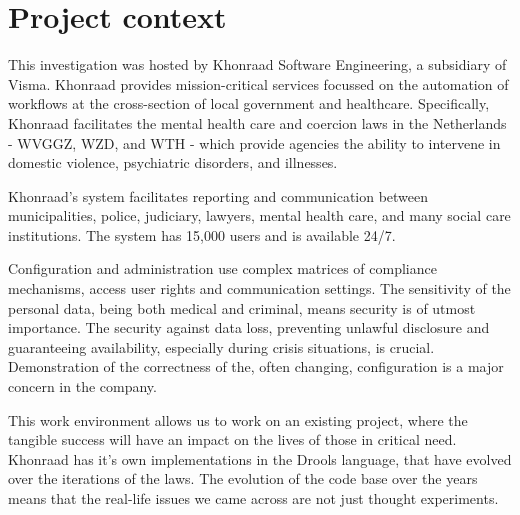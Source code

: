 \section{Project context}

This investigation was hosted by Khonraad Software Engineering, a subsidiary of Visma.
Khonraad provides mission-critical services focussed on the automation of workflows at the cross-section of local government and healthcare.
Specifically, Khonraad facilitates the mental health care and coercion laws in the Netherlands - WVGGZ, WZD, and WTH - which provide agencies the ability to intervene in domestic violence, psychiatric disorders, and illnesses.

Khonraad's system facilitates reporting and communication between municipalities, police, judiciary, lawyers, mental health care, and many social care institutions.
The system has 15,000 users and is available 24/7. 

Configuration and administration use complex matrices of compliance mechanisms, access user rights and communication settings.
The sensitivity of the personal data, being both medical and criminal, means security is of utmost importance.
The security against data loss, preventing unlawful disclosure and guaranteeing availability, especially during crisis situations, is crucial.
Demonstration of the correctness of the, often changing, configuration is a major concern in the company. 

This work environment allows us to work on an existing project, where the tangible success will have an impact on the lives of those in critical need.
Khonraad has it's own implementations in the Drools language, that have evolved over the iterations of the laws.
The evolution of the code base over the years means that the real-life issues we came across are not just thought experiments.